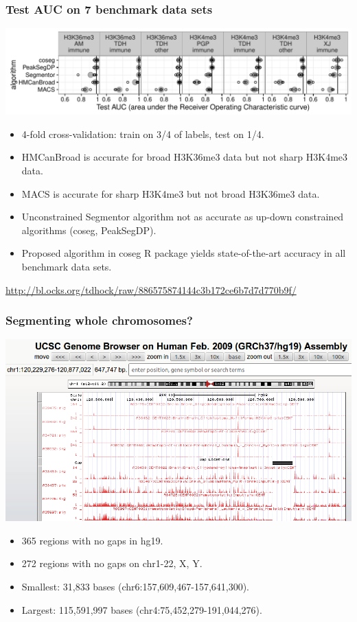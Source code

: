 \documentclass{beamer}
\begin{document}
\begin{frame}
  \frametitle{Test AUC on 7 benchmark data sets}
  \includegraphics[width=\textwidth]{figure-test-error-dots}
  \begin{itemize}
  \item 4-fold cross-validation: train on 3/4 of labels, test on 1/4.
  \item HMCanBroad is accurate for broad H3K36me3 data but not sharp H3K4me3 data.
  \item MACS is accurate for sharp H3K4me3 but not broad H3K36me3 data.
  \item Unconstrained Segmentor algorithm not as accurate as up-down
    constrained algorithms (coseg, PeakSegDP).
  \item Proposed algorithm in coseg R package yields state-of-the-art
    accuracy in all benchmark data sets.
  \end{itemize}
  \scriptsize
\url{http://bl.ocks.org/tdhock/raw/886575874144c3b172ce6b7d7d770b9f/}
\end{frame}

\begin{frame}
  \frametitle{Segmenting whole chromosomes?}
  \includegraphics[width=\textwidth]{screenshot-gap-peaks}
  \begin{itemize}
  \item 365 regions with no gaps in hg19.
  \item 272 regions with no gaps on chr1-22, X, Y.
  \item Smallest: 31,833 bases (chr6:157,609,467-157,641,300).
  \item Largest: 115,591,997 bases (chr4:75,452,279-191,044,276).
  \end{itemize}
\end{frame}
\end{document}
